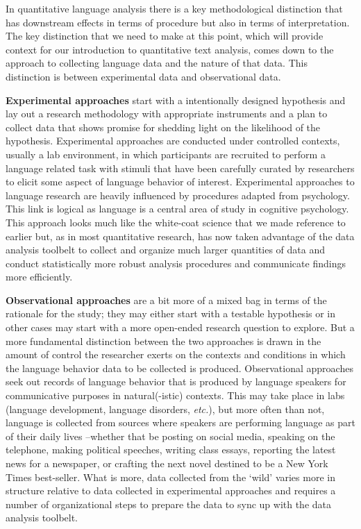 \documentclass[
  letterpaper,
]{latex/krantz}
\theoremstyle{definition}
\theoremstyle{remark}
\begin{document}
In quantitative language analysis there is a key methodological
distinction that has downstream effects in terms of procedure but also
in terms of interpretation. The key distinction that we need to make at
this point, which will provide context for our introduction to
quantitative text analysis, comes down to the approach to collecting
language data and the nature of that data. This distinction is between
experimental data and observational data.

\textbf{Experimental approaches} start with a
intentionally designed hypothesis and lay out a research methodology
with appropriate instruments and a plan to collect data that shows
promise for shedding light on the likelihood of the hypothesis.
Experimental approaches are conducted under controlled contexts, usually
a lab environment, in which participants are recruited to perform a
language related task with stimuli that have been carefully curated by
researchers to elicit some aspect of language behavior of interest.
Experimental approaches to language research are heavily influenced by
procedures adapted from psychology. This link is logical as language is
a central area of study in cognitive psychology. This approach looks
much like the white-coat science that we made reference to earlier but,
as in most quantitative research, has now taken advantage of the data
analysis toolbelt to collect and organize much larger quantities of data
and conduct statistically more robust analysis procedures and
communicate findings more efficiently.

\textbf{Observational approaches} are a bit
more of a mixed bag in terms of the rationale for the study; they may
either start with a testable hypothesis or in other cases may start with
a more open-ended research question to explore. But a more fundamental
distinction between the two approaches is drawn in the amount of control
the researcher exerts on the contexts and conditions in which the
language behavior data to be collected is produced. Observational
approaches seek out records of language behavior that is produced by
language speakers for communicative purposes in natural(-istic)
contexts. This may take place in labs (language development, language
disorders, \emph{etc.}), but more often than not, language is collected
from sources where speakers are performing language as part of their
daily lives --whether that be posting on social media, speaking on the
telephone, making political speeches, writing class essays, reporting
the latest news for a newspaper, or crafting the next novel destined to
be a New York Times best-seller. What is more, data collected from the
`wild' varies more in structure relative to data collected in
experimental approaches and requires a number of organizational steps to
prepare the data to sync up with the data analysis toolbelt.
\end{document}
